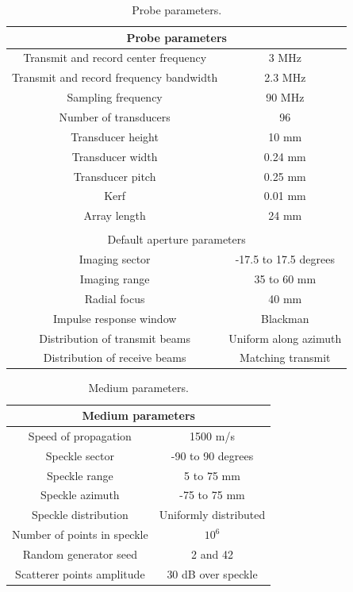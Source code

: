 \begin{table}[!ht]
\centering
\begin{tabular}{|*{2}{c|}}
 \hline
 \multicolumn{2}{c}{Probe parameters} \\
  \hline
  Transmit and record center frequency    &   3 MHz \\
  Transmit and record frequency bandwidth    &   2.3 MHz \\
  Sampling frequency    &   90 MHz \\
  Number of transducers &   96 \\
  Transducer height   &   10 mm \\
  Transducer width   &   0.24 mm \\
  Transducer pitch   &   0.25 mm \\
  Kerf   &   0.01 mm \\
  Array length   &   24 mm \\
  \hline
  \multicolumn{2}{c}{} \\
  
  \hline
  \multicolumn{2}{c}{Default aperture parameters} \\
  \hline
  Imaging sector  &   -17.5 to 17.5 degrees \\
  Imaging range     &   35 to 60 mm \\
  Radial focus   &   40 mm \\
  Impulse response window   &   Blackman \\
  Distribution of transmit beams   &   Uniform along azimuth \\
  Distribution of receive beams   &   Matching transmit \\
  \hline
 \end{tabular}
\caption{Probe parameters.}
\label{table:aperture_param}
\end{table}
  
\begin{table}[!ht]
\centering
\begin{tabular}{|*{2}{c|}}
 \hline
 \multicolumn{2}{c}{Medium parameters} \\
  \hline
  Speed of propagation    &   1500 m/s \\
  Speckle sector    &   -90 to 90 degrees \\
  Speckle range     &   5 to 75 mm \\
  Speckle azimuth   &   -75 to 75 mm \\
  Speckle distribution  &   Uniformly distributed \\
  Number of points in speckle    &   $10^6$ \\
  Random generator seed     &   2 and 42 \\
  Scatterer points amplitude   &   30 dB over speckle \\
  \hline
 \end{tabular}
\caption{Medium parameters.}
\label{table:medium_param}
\end{table} 


